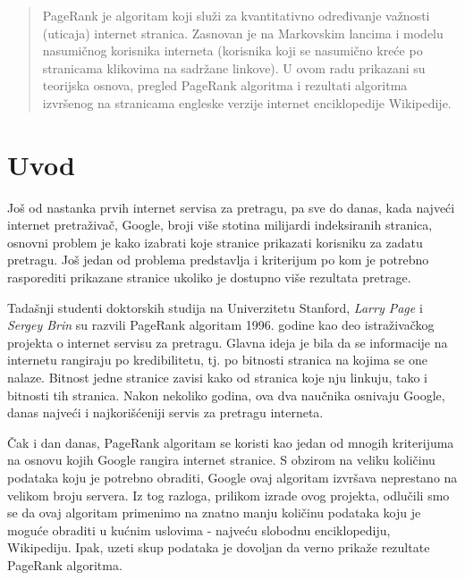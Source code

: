 \documentclass[12pt, journal, compsoc]{IEEEtran}
\begin{document}
\begin{abstract}
PageRank je algoritam koji služi za kvantitativno određivanje važnosti (uticaja) internet stranica. Zasnovan je na Markovskim lancima i modelu nasumičnog korisnika interneta (korisnika koji se nasumično kreće po stranicama klikovima na sadržane linkove). U ovom radu prikazani su teorijska osnova, pregled PageRank algoritma i rezultati algoritma izvršenog na stranicama engleske verzije internet enciklopedije Wikipedije.
\end{abstract}


%
\IEEEpeerreviewmaketitle

\section{Uvod}
Još od nastanka prvih internet servisa za pretragu, pa sve do danas, kada najveći internet pretraživač, Google, broji više stotina milijardi indeksiranih stranica, osnovni problem je kako izabrati koje stranice prikazati korisniku za zadatu pretragu. Još jedan od problema predstavlja i kriterijum po kom je potrebno rasporediti prikazane stranice ukoliko je dostupno više rezultata pretrage.
\par
Tadašnji studenti doktorskih studija na Univerzitetu Stanford, \textit{Larry Page} i \textit{Sergey Brin} su razvili PageRank algoritam 1996. godine kao deo istraživačkog projekta o internet servisu za pretragu. Glavna ideja je bila da se informacije na internetu rangiraju po kredibilitetu, tj. po bitnosti stranica na kojima se one nalaze. Bitnost jedne stranice zavisi kako od stranica koje nju linkuju, tako i bitnosti tih stranica. Nakon nekoliko godina, ova dva naučnika osnivaju Google, danas najveći i najkorišćeniji servis za pretragu interneta.
\par
Čak i dan danas, PageRank algoritam se koristi kao jedan od mnogih kriterijuma na osnovu kojih Google rangira internet stranice. S obzirom na veliku količinu podataka koju je potrebno obraditi, Google ovaj algoritam izvršava neprestano na velikom broju servera. Iz tog razloga, prilikom izrade ovog projekta, odlučili smo se da ovaj algoritam primenimo na znatno manju količinu podataka koju je moguće obraditi u kućnim uslovima - najveću slobodnu enciklopediju, Wikipediju. Ipak, uzeti skup podataka je dovoljan da verno prikaže rezultate PageRank algoritma.
\end{document}
